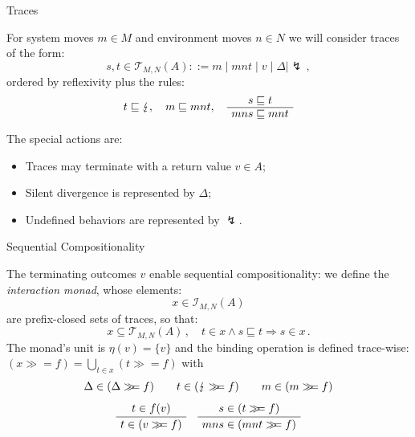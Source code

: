 \documentclass{beamer}
\newcommand{\bind}{\gg\!\!=}
\begin{document}
\begin{frame}{Traces} %

For system moves $m \in M$ and environment moves $n \in N$
we will consider traces of the form:
\[
    s, t \in
    \mathcal{T}_{M,N}(A) ::=
    m \mid mnt \mid v \mid \Delta \mid \lightning \,,
\]
ordered by reflexivity plus the rules:
\[
  t \sqsubseteq \lightning , \quad
  m \sqsubseteq mnt ,
  \quad
  \AxiomC{$s \sqsubseteq t$}
  \UnaryInfC{$mns \sqsubseteq mnt$}
  \DisplayProof
\]

The special actions are:
\begin{itemize}
\item Traces may terminate with a return value $v \in A$;
\item Silent divergence is represented by $\Delta$;
\item Undefined behaviors are represented by $\lightning$.
\end{itemize}

\end{frame}

\begin{frame}{Sequential Compositionality} %

The terminating outcomes $v$ enable sequential compositionality:
we define the \emph{interaction monad},
whose elements:
\[ x \in \mathcal{I}_{M,N}(A) \]
are prefix-closed sets of traces, so that:
\[ x \subseteq \mathcal{T}_{M,N}(A) \,, \quad
   t \in x \wedge s \sqsubseteq t \Rightarrow s \in x \,. \]
The monad's unit is $\eta(v) = \{ v \}$ and
the binding operation is defined trace-wise:
$(x \bind f) = \bigcup_{t \in x} (t \bind f)$ with
\begin{gather*}
  \Delta \in (\Delta \bind f)
  \qquad
  t \in (\lightning \bind f)
  \qquad
  m \in (m \bind f)
  \\[1ex]
  \AxiomC{$t \in f(v)$}
  \UnaryInfC{$t \in (v \bind f)$}
  \DisplayProof
  \quad
  \AxiomC{$s \in (t \bind f)$}
  \UnaryInfC{$mns \in (mnt \bind f)$}
  \DisplayProof
\end{gather*}

\end{frame}
\end{document}
